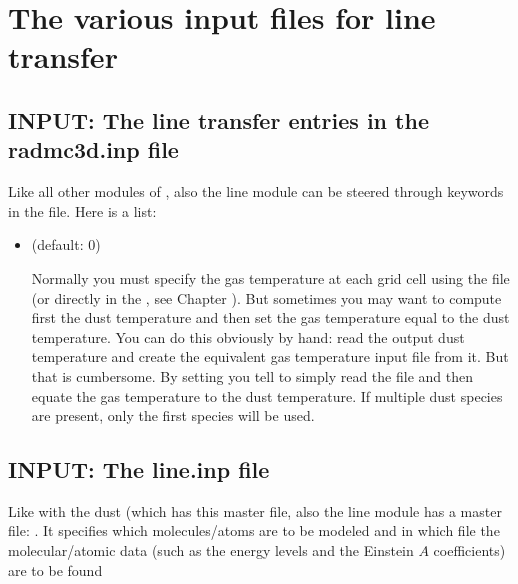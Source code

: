 \documentclass[letterpaper,10pt,english]{sphinxmanual}
\begin{document}
\section{The various input files for line transfer}
\label{\detokenize{lineradtrans:the-various-input-files-for-line-transfer}}

\subsection{INPUT: The line transfer entries in the radmc3d.inp file}
\label{\detokenize{lineradtrans:input-the-line-transfer-entries-in-the-radmc3d-inp-file}}\label{\detokenize{lineradtrans:sec-line-radmc-inp}}
Like all other modules of , also the line module
can be steered through keywords in the  file.
Here is a list:
\begin{itemize}
\item {} 
 (default: 0)

Normally you must specify the gas temperature at each grid cell using the
 file (or directly in the , see
Chapter {\hyperref[\detokenize{internalsetup:chap-internal-setup}]{}}). But sometimes you may want to compute
first the dust temperature and then set the gas temperature equal to the dust
temperature. You can do this obviously by hand: read the output dust
temperature and create the equivalent gas temperature input file from it. But
that is cumbersome.  By setting  you tell  to
simply read the  file and then equate the gas
temperature to the dust temperature. If multiple dust species are present,
only the first species will be used.

\end{itemize}


\subsection{INPUT: The line.inp file}
\label{\detokenize{lineradtrans:input-the-line-inp-file}}\label{\detokenize{lineradtrans:sec-line-dot-inp}}
Like with the dust (which has this  master file,
also the line module has a master file: . It specifies
which molecules/atoms are to be modeled and in which file the
molecular/atomic data (such as the energy levels and the Einstein \(A\)
coefficients) are to be found
\end{document}
